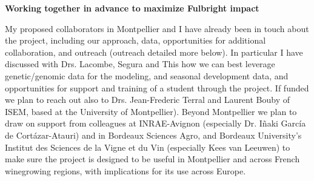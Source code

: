 \documentclass[11pt,letter,oneside]{article}
\begin{document}
{\bf Working together in advance to maximize Fulbright impact} 

My proposed collaborators in Montpellier and I have already been in touch about the project, including our approach, data, opportunities for additional collaboration, and outreach (outreach detailed more below). In particular I have discussed with Drs. Lacombe, Segura and This how we can best leverage genetic/genomic data for the modeling, and seasonal development data, and opportunities for support and training of a student through the project. If funded we plan to reach out also to Drs. Jean-Frederic Terral and Laurent Bouby of ISEM, based at the University of Montpellier). Beyond Montpellier we plan to draw on support from colleagues at INRAE-Avignon (especially Dr. I\~naki Garc\'ia de Cort\'azar-Atauri) and in Bordeaux Sciences Agro, and Bordeaux University’s Institut des Sciences de la Vigne et du Vin (especially Kees van Leeuwen) to make sure the project is designed to be useful in Montpellier and across French winegrowing regions, with implications for its use across Europe. %

\end{document}
